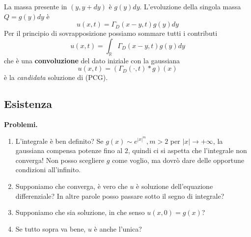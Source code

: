 \documentclass[10pt,a4paper,twoside,openright]{book}
\begin{document}
La massa presente in $(y,y+dy)$ è $g(y) dy$. L'evoluzione della singola massa $Q=g(y) dy$ è
\begin{equation*}
u(x,t) =\Gamma _{D}(x-y,t) g(y) dy
\end{equation*}
Per il principio di sovrapposizione possiamo sommare tutti i contributi
\begin{equation*}
u(x,t) =\int _{\mathbb{R}} \Gamma _{D}(x-y,t) g(y) dy
\end{equation*}
che è una \textbf{convoluzione} del dato iniziale con la gaussiana
\begin{equation*}
u(x,t) =( \Gamma _{D}(\cdotp,t) *g)(x)
\end{equation*}
è la \textit{candidata} soluzione di (PCG).
\subsection{Esistenza}

\textbf{Problemi.}
\begin{enumerate}
\item L'integrale è ben definito? Se $g(x) \sim e^{|x|^m},m >2$ per $| x| \rightarrow +\infty $, la gaussiana compensa potenze fino al $2$, quindi ci si aspetta che l'integrale non converga! Non posso scegliere $g$ come voglio, ma dovrò dare delle opportune condizioni all'infinito.
\item Supponiamo che converga, è vero che $u$ è soluzione dell'equazione differenziale? In altre parole posso passare sotto il segno di integrale?
\item Supponiamo che sia soluzione, in che senso $u(x,0) =g(x)$?
\item Se tutto sopra va bene, $u$ è anche l'unica?
\end{enumerate}
\end{document}
